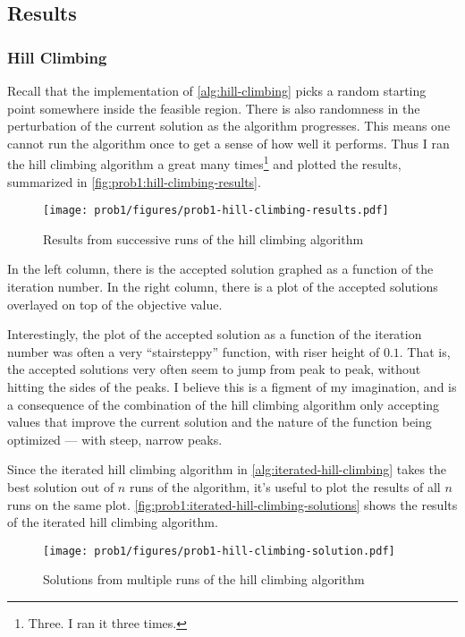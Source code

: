 \documentclass{article}
\begin{document}
\subsection{Results}

\subsubsection{Hill Climbing}

Recall that the implementation of \autoref{alg:hill-climbing} picks a random starting point
somewhere inside the feasible region. There is also randomness in the perturbation of the current
solution as the algorithm progresses. This means one cannot run the algorithm once to get a sense
of how well it performs. Thus I ran the hill climbing algorithm a great many times\footnote{Three.
    I ran it three times.} and plotted the results, summarized in
\autoref{fig:prob1:hill-climbing-results}.

\begin{figure}[H]
    \centering
    \texttt{[image: prob1/figures/prob1-hill-climbing-results.pdf]}
    \caption{Results from successive runs of the hill climbing
        algorithm}\label{fig:prob1:hill-climbing-results}
\end{figure}

In the left column, there is the accepted solution graphed as a function of the iteration number.
In the right column, there is a plot of the accepted solutions overlayed on top of the objective
value.

Interestingly, the plot of the accepted solution as a function of the iteration number was often a
very ``stairsteppy'' function, with riser height of $0.1$. That is, the accepted solutions very
often seem to jump from peak to peak, without hitting the sides of the peaks. I believe this is a
figment of my imagination, and is a consequence of the combination of the hill climbing algorithm
only accepting values that improve the current solution and the nature of the function being
optimized --- with steep, narrow peaks.

Since the iterated hill climbing algorithm in \autoref{alg:iterated-hill-climbing} takes the best
solution out of $n$ runs of the algorithm, it's useful to plot the results of all $n$ runs on the
same plot. \autoref{fig:prob1:iterated-hill-climbing-solutions} shows the results of the iterated
hill climbing algorithm.

\begin{figure}[h]
    \centering
    \texttt{[image: prob1/figures/prob1-hill-climbing-solution.pdf]}
    \caption{Solutions from multiple runs of the hill climbing
        algorithm}\label{fig:prob1:iterated-hill-climbing-solutions}
\end{figure}
\end{document}

